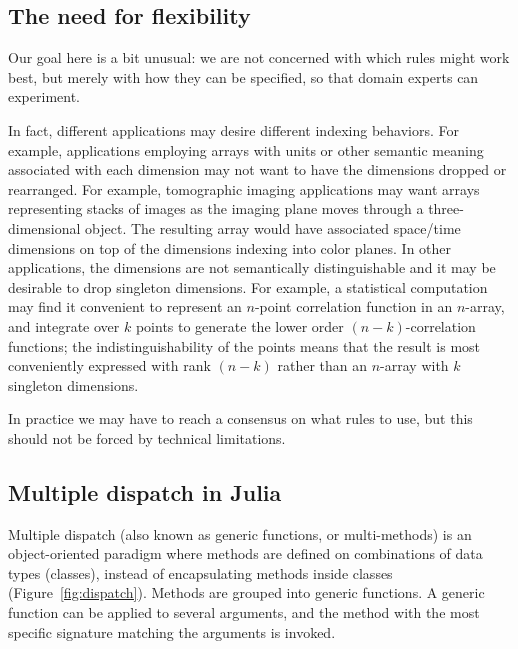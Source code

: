 \documentclass{sigplanconf}
\begin{document}

\subsection{The need for flexibility}

Our goal here is a bit unusual: we are not concerned with which rules might
work best, but merely with how they can be specified, so that domain experts
can experiment.

In fact, different applications may desire different indexing behaviors. For
example, applications employing arrays with units or other semantic meaning
associated with each dimension may not want to have the dimensions dropped or
rearranged. For example, tomographic imaging applications may want arrays
representing stacks of images as the imaging plane moves through a three-
dimensional object. The resulting array would have associated space/time
dimensions on top of the dimensions indexing into color planes. In
other applications, the dimensions are not semantically distinguishable and it
may be desirable to drop singleton dimensions. For example, a statistical
computation may find it convenient to represent an $n$-point correlation
function in an $n$-array, and integrate over $k$ points to generate the lower
order $(n\!-\!k)$-correlation functions; the indistinguishability of the points
means that the result is most conveniently expressed with rank $(n\!-\!k)$
rather than an $n$-array with $k$ singleton dimensions.


In practice we may have to reach a consensus on what rules to use, but this
should not be forced by technical limitations.

\subsection{Multiple dispatch in Julia}

Multiple dispatch (also known as generic functions, or multi-methods) is an
object-oriented paradigm where methods are defined on combinations of data
types (classes), instead of encapsulating methods inside classes
(Figure~\ref{fig:dispatch}). Methods are
grouped into generic functions. A generic function can be applied to several
arguments, and the method with the most specific signature matching the
arguments is invoked.
\end{document}
